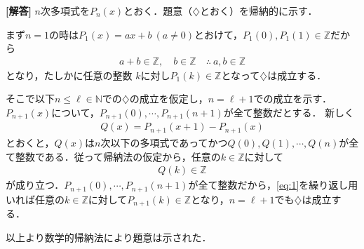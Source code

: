 \documentclass[../../main.tex]{subfiles}
\begin{document}
\begin{oframed}
  
\end{oframed}

{\bf [解答]}
$n$次多項式を$P_n(x)$とおく．題意（$\diamondsuit$とおく）を帰納的に示す．

まず$n=1$の時は$P_1(x)=ax+b\ (a\ne0)$とおけて，$P_1(0),P_1(1)\in\mathbb{Z}$だから
\begin{align}
  a+b\in\mathbb{Z}, \quad b\in\mathbb{Z} \quad\therefore\ a,b\in\mathbb{Z}
\end{align}
となり，たしかに任意の整数 $k$に対し$P_1(k)\in\mathbb{Z}$となって$\diamondsuit$は成立する．

そこで以下$n \le \ell \in\mathbb{N}$での$\diamondsuit$の成立を仮定し，$n=\ell+1$での成立を示す．
$P_{n+1}(x)$について，$P_{n+1}(0),\cdots,P_{n+1}(n+1)$が全て整数だとする．
新しく
\begin{align}
  Q(x)=P_{n+1}(x+1)-P_{n+1}(x) \label{eq:1}
\end{align}
とおくと，$Q(x)$は$n$次以下の多項式であってかつ$Q(0),Q(1),\cdots,Q(n)$が全て整数である．従って帰納法の仮定から，任意の$k\in\mathbb{Z}$に対して
\begin{align}
  Q(k)\in\mathbb{Z}
\end{align}
が成り立つ．$P_{n+1}(0),\cdots,P_{n+1}(n+1)$が全て整数だから，\cref{eq:1}を繰り返し用いれば任意の$k\in\mathbb{Z}$に対して$P_{n+1}(k)\in\mathbb{Z}$となり，$n=\ell+1$でも$\diamondsuit$は成立する．

以上より数学的帰納法により題意は示された．

\newpage
\end{document}
